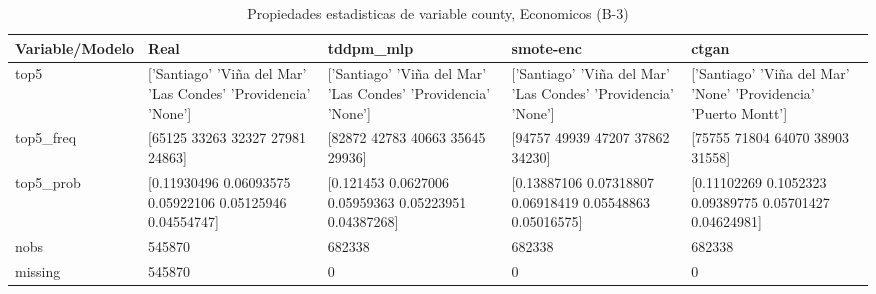 \begin{table}[H]
\centering
\fontsize{8}{14}\selectfont
\caption{Propiedades  estadisticas de variable county, Economicos (B-3)}
\label{table-stats-economicos-b-3-county}
\begin{tabular}{|l|m{10em}|m{10em}|m{10em}|m{10em}|}
\hline
 \rowcolor[gray]{0.8}
Variable/Modelo & Real & tddpm\_mlp & smote-enc & ctgan \\
\hline top5 & ['Santiago' 'Viña del Mar' 'Las Condes' 'Providencia' 'None'] & ['Santiago' 'Viña del Mar' 'Las Condes' 'Providencia' 'None'] & ['Santiago' 'Viña del Mar' 'Las Condes' 'Providencia' 'None'] & ['Santiago' 'Viña del Mar' 'None' 'Providencia' 'Puerto Montt'] \\
\hline top5\_freq & [65125 33263 32327 27981 24863] & [82872 42783 40663 35645 29936] & [94757 49939 47207 37862 34230] & [75755 71804 64070 38903 31558] \\
\hline top5\_prob & [0.11930496 0.06093575 0.05922106 0.05125946 0.04554747] & [0.121453   0.0627006  0.05959363 0.05223951 0.04387268] & [0.13887106 0.07318807 0.06918419 0.05548863 0.05016575] & [0.11102269 0.1052323  0.09389775 0.05701427 0.04624981] \\
\hline nobs & 545870 & 682338 & 682338 & 682338 \\
\hline missing & 545870 & 0 & 0 & 0 \\
\hline
\end{tabular}
\end{table}
